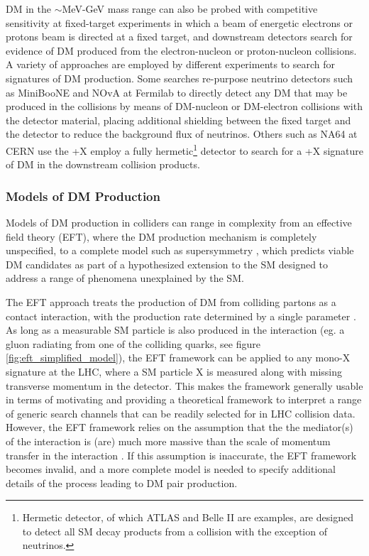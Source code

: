 DM in the \(\sim\)MeV-GeV mass range can also be probed with competitive sensitivity at fixed-target experiments in which a beam of energetic electrons or protons beam is directed at a fixed target, and downstream detectors search for evidence of DM produced from the electron-nucleon or proton-nucleon collisions. A variety of approaches are employed by different experiments to search for signatures of DM production. Some searches re-purpose neutrino detectors such as MiniBooNE \cite{miniboone_2018} and NOvA \cite{nova_2017} at Fermilab to directly detect any DM that may be produced in the collisions by means of DM-nucleon or DM-electron collisions with the detector material, placing additional shielding between the fixed target and the detector to reduce the background flux of neutrinos. Others such as NA64 \cite{na64_2019} at CERN use the \met+X employ a fully hermetic\footnote{Hermetic detector, of which ATLAS and Belle II are examples, are designed to detect all SM decay products from a collision with the exception of neutrinos.} detector to search for a \met+X signature of DM in the downstream collision products.

\subsubsection{Models of DM Production}

Models of DM production in colliders can range in complexity from an effective field theory (EFT), where the DM production mechanism is completely unspecified, to a complete model such as supersymmetry \cite{susy_dm}, which predicts viable DM candidates as part of a hypothesized extension to the SM designed to address a range of phenomena unexplained by the SM. 

The EFT approach treats the production of DM from colliding partons as a contact interaction, with the production rate determined by a single parameter \cite{DM_colliders}. As long as a measurable SM particle is also produced in the interaction (eg. a gluon radiating from one of the colliding quarks, see figure \ref{fig:eft_simplified_model}), the EFT framework can be applied to any mono-X signature at the LHC, where a SM particle X is measured along with missing transverse momentum in the detector. This makes the framework generally usable in terms of motivating and providing a theoretical framework to interpret a range of generic search channels that can be readily selected for in LHC collision data. However, the EFT framework relies on the assumption that the the mediator(s) of the interaction is (are) much more massive than the scale of momentum transfer in the interaction \cite{DM_colliders, beyond_eft}. If this assumption is inaccurate, the EFT framework becomes invalid, and a more complete model is needed to specify additional details of the process leading to DM pair production. 

